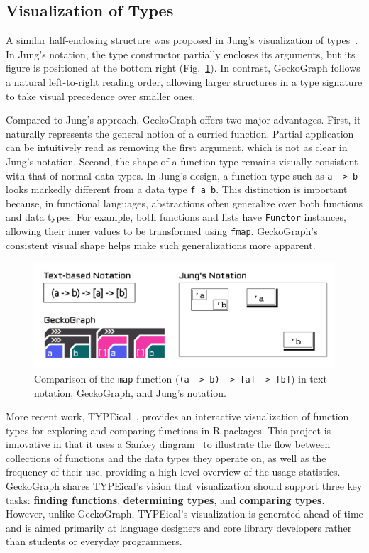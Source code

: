 \documentclass[preprint,12pt]{elsarticle}
\begin{document}
\subsection{Visualization of Types}
A similar half-enclosing structure was proposed in Jung’s visualization of types~\cite{Jung2000-oc}. In Jung’s notation, the type constructor partially encloses its arguments, but its figure is positioned at the bottom right (Fig.~\ref{fig:jung}). In contrast, GeckoGraph follows a natural left-to-right reading order, allowing larger structures in a type signature to take visual precedence over smaller ones. 

Compared to Jung’s approach, GeckoGraph offers two major advantages. 
First, it naturally represents the general notion of a curried function. Partial application can be intuitively read as removing the first argument, which is not as clear in Jung’s notation. 
Second, the shape of a function type remains visually consistent with that of normal data types. In Jung’s design, a function type such as \texttt{a -> b} looks markedly different from a data type \texttt{f a b}. 
This distinction is important because, in functional languages, abstractions often generalize over both functions and data types. 
For example, both functions and lists have \texttt{Functor} instances, allowing their inner values to be transformed using \texttt{fmap}. 
GeckoGraph’s consistent visual shape helps make such generalizations more apparent.

\begin{figure}
  \includegraphics[width=\linewidth]{figures/Jung}
  \caption{
        \label{fig:jung}
        Comparison of the \texttt{map} function (\texttt{(a -> b) -> [a] -> [b]}) in text notation, GeckoGraph, and Jung’s notation.
  }
\end{figure}

More recent work, TYPEical~\cite{Moy2020-tr}, provides an interactive visualization of function types for exploring and comparing functions in R packages. 
This project is innovative in that it uses a Sankey diagram~\cite{Keiderling2012-ag} to illustrate the flow between collections of functions and the data types they operate on, as well as the frequency of their use, providing a high level overview of the usage statistics. 
GeckoGraph shares TYPEical’s vision that visualization should support three key tasks: \textbf{finding functions}, \textbf{determining types}, and \textbf{comparing types}. 
However, unlike GeckoGraph, TYPEical’s visualization is generated ahead of time and is aimed primarily at language designers and core library developers rather than students or everyday programmers.
\end{document}
